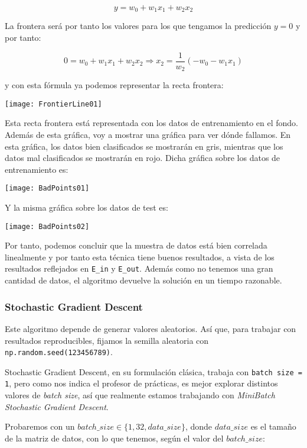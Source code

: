 \documentclass[11pt]{article}
\begin{document}
\begin{displaymath}
y = w_0 + w_1 x_1 + w_2 x_2
\end{displaymath}

La frontera será por tanto los valores para los que tengamos la predicción $y = 0$ y por tanto:

\begin{displaymath}
    0 = w_0 + w_1 x_1 + w_2 x_2 \Longrightarrow x_2 = \frac{1}{w_2} (-w_0 - w_1 x_1)
\end{displaymath}

y con esta fórmula ya podemos representar la recta frontera:

\texttt{[image: FrontierLine01]}

Esta recta frontera está representada con los datos de entrenamiento en el fondo. Además de esta gráfica, voy a mostrar una gráfica para ver dónde fallamos. En esta gráfica, los datos bien clasificados se mostrarán en gris, mientras que los datos mal clasificados se mostrarán en rojo. Dicha gráfica sobre los datos de entrenamiento es:

\texttt{[image: BadPoints01]}

Y la misma gráfica sobre los datos de test es:

\texttt{[image: BadPoints02]}

Por tanto, podemos concluir que la muestra de datos está bien correlada linealmente y por tanto esta técnica tiene buenos resultados, a vista de los resultados reflejados en \lstinline{E_in} y \lstinline{E_out}. Además como no tenemos una gran cantidad de datos, el algoritmo devuelve la solución en un tiempo razonable.

\subsubsection{Stochastic Gradient Descent}

Este algoritmo depende de generar valores aleatorios. Así que, para trabajar con resultados reproducibles, fijamos la semilla aleatoria con \lstinline{np.random.seed(123456789)}.

Stochastic Gradient Descent, en su formulación clásica, trabaja con \lstinline{batch size = 1}, pero como nos indica el profesor de prácticas, es mejor explorar distintos valores de \emph{batch size}, así que realmente estamos trabajando con \emph{MiniBatch Stochastic Gradient Descent}.

Probaremos con un $batch\_size \in \{1, 32, data\_size\}$, donde $data\_size$ es el tamaño de la matriz de datos, con lo que tenemos, según el valor del $batch\_size$:
\end{document}
